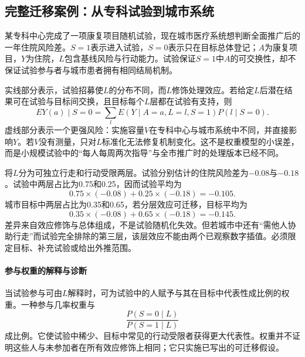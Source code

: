 \subsection{完整迁移案例：从专科试验到城市系统}

某专科中心完成了一项康复项目随机试验，现在城市医疗系统想判断全面推广后的一年住院风险差。$S=1$表示进入试验，$S=0$表示只在目标总体登记；$A$为康复项目，$Y$为住院，$L$包含基线风险与行动能力。试验保证$S=1$中$A$的可交换性，却不保证试验参与者与城市患者拥有相同结局机制。

\begin{center}
\end{center}

实线部分表示，试验招募使$L$的分布不同，而$L$修饰处理效应。若给定$L$后潜在结果可在试验与目标间交换，且目标每个$L$层都在试验有支持，则
\[
E{Y(a)\mid S=0}=
\sum_l E(Y\mid A=a,L=l,S=1)P(l\mid S=0).
\]
虚线部分表示一个更强风险：实施容量$V$在专科中心与城市系统中不同，并直接影响$Y$。若$V$没有测量，只对$L$标准化无法修复机制变化。这不是权重模型的小误差，而是小规模试验中的“每人每周两次指导”与全市推广时的处理版本已经不同。

\begin{workedexample}[总体组成改变的数值后果]
将$L$分为可独立行走和行动受限两层。试验分别估计的住院风险差为$-0.08$与$-0.18$。试验中两层占比为0.75和0.25，因而试验平均为
\[
0.75\times(-0.08)+0.25\times(-0.18)=-0.105.
\]
城市目标中两层占比为0.35和0.65，若分层效应可迁移，目标平均为
\[
0.35\times(-0.08)+0.65\times(-0.18)=-0.145.
\]
差异来自效应修饰与总体组成，不是试验随机化失效。但若城市中还有“需他人协助行走”而试验完全排除的第三层，该层效应不能由两个已观察数字插值。必须限定目标、补充试验或给出外推范围。
\end{workedexample}

\paragraph{参与权重的解释与诊断}

当试验参与可由$L$解释时，可为试验中的人赋予与其在目标中代表性成比例的权重。一种参与几率权重与
\[
\frac{P(S=0\mid L)}{P(S=1\mid L)}
\]
成比例。它使试验中稀少、目标中常见的行动受限者获得更大代表性。权重并不证明这些人与未参加者在所有效应修饰上相同；它只实施已写出的可迁移假设。

